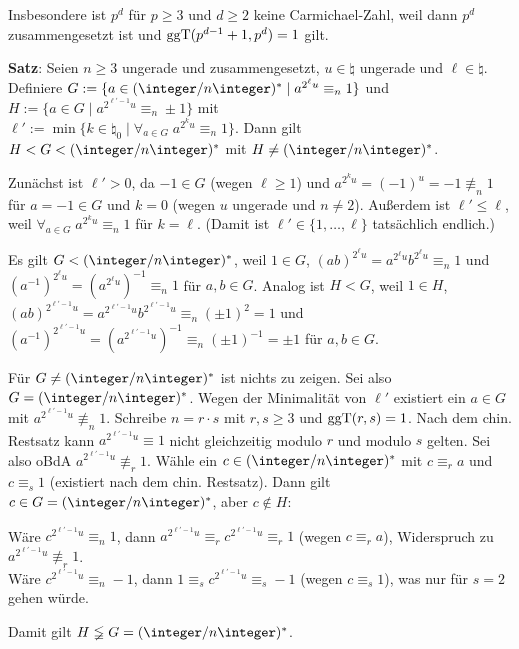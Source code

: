 Insbesondere ist $p^d$ für $p \ge 3$ und $d \ge 2$ keine Carmichael-Zahl, weil dann
$p^d$ zusammengesetzt ist und $\operatorname{ggT}(p^{d-1}+1, p^d) = 1$ gilt.

\linie
\pagebreak

\textbf{Satz}:
Seien $n \ge 3$ ungerade und zusammengesetzt, $u \in \natural$ ungerade und $\ell \in \natural$.\\
Definiere $G := \{a \in (\ZnZ)^\ast \;|\; a^{2^\ell u} \equiv_n 1\}$ und
$H := \{a \in G \;|\; a^{2^{\ell'-1} u} \equiv_n \pm 1\}$ mit\\
$\ell' := \min\{k \in \natural_0 \;|\; \forall_{a \in G}\; a^{2^k u} \equiv_n 1\}$.
Dann gilt $H < G < (\ZnZ)^\ast$ mit $H \not= (\ZnZ)^\ast$.

\begin{Beweis}
    Zunächst ist $\ell' > 0$, da $-1 \in G$ (wegen $\ell \ge 1$)
    und $a^{2^k u} = (-1)^u = -1 \not\equiv_n 1$ für $a = -1 \in G$ und $k = 0$
    (wegen $u$ ungerade und $n \not= 2$).
    Außerdem ist $\ell' \le \ell$, weil $\forall_{a \in G}\; a^{2^k u} \equiv_n 1$ für $k = \ell$.
    (Damit ist $\ell' \in \{1, \dotsc, \ell\}$ tatsächlich endlich.)
    
    Es gilt $G < (\ZnZ)^\ast$, weil $1 \in G$,
    $(ab)^{2^\ell u} = a^{2^\ell u} b^{2^\ell u} \equiv_n 1$ und
    $(a^{-1})^{2^\ell u} = (a^{2^\ell u})^{-1} \equiv_n 1$ für $a, b \in G$.
    Analog ist $H < G$, weil $1 \in H$,
    $(ab)^{2^{\ell'-1} u} = a^{2^{\ell'-1} u} b^{2^{\ell'-1} u} \equiv_n (\pm 1)^2 = 1$ und
    $(a^{-1})^{2^{\ell'-1} u} = (a^{2^{\ell'-1} u})^{-1} \equiv_n (\pm 1)^{-1} = \pm 1$ für
    $a, b \in G$.
    
    Für $G \not= (\ZnZ)^\ast$ ist nichts zu zeigen.
    Sei also $G = (\ZnZ)^\ast$.
    Wegen der Minimalität von $\ell'$ existiert ein $a \in G$ mit
    $a^{2^{\ell'-1} u} \not\equiv_n 1$.
    Schreibe $n = r \cdot s$ mit $r, s \ge 3$ und $\operatorname{ggT}(r, s) = 1$.
    Nach dem chin. Restsatz kann $a^{2^{\ell'-1} u} \equiv 1$
    nicht gleichzeitig modulo $r$ und modulo $s$ gelten.
    Sei also oBdA $a^{2^{\ell'-1} u} \not\equiv_r 1$.
    Wähle ein $c \in (\ZnZ)^\ast$ mit $c \equiv_r a$ und $c \equiv_s 1$
    (existiert nach dem chin. Restsatz).
    Dann gilt $c \in G = (\ZnZ)^\ast$, aber $c \notin H$:
    
    Wäre $c^{2^{\ell'-1} u} \equiv_n 1$, dann
    $a^{2^{\ell'-1} u} \equiv_r c^{2^{\ell'-1} u} \equiv_r 1$ (wegen $c \equiv_r a$),
    Widerspruch zu $a^{2^{\ell'-1} u} \not\equiv_r 1$.\\
    Wäre $c^{2^{\ell'-1} u} \equiv_n -1$, dann
    $1 \equiv_s c^{2^{\ell'-1} u} \equiv_s -1$ (wegen $c \equiv_s 1$),
    was nur für $s = 2$ gehen würde.
    
    Damit gilt $H \lneqq G = (\ZnZ)^\ast$.
\end{Beweis}

